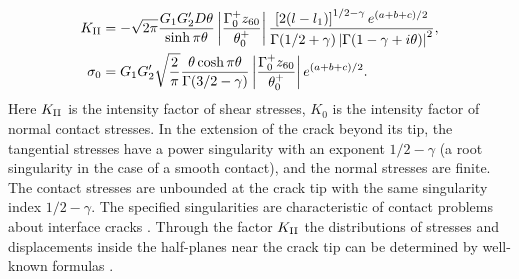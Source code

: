 \begin{align*}
K_{{\rm II}} &=-\sqrt{2\pi } \dfrac{G_{1} G'_{2} D\theta }{\sinh \pi \theta } \left|\dfrac{\Gamma _{0}^{+} z_{60} }{\theta _{0}^{+} } \right|\dfrac{\left[2(l-l_{1} )\right]^{1/2 -\gamma } e^{(a+b+c)/2} }{\Gamma (1/2 +\gamma )\left|\Gamma (1-\gamma +i\theta )\right|^{2} } ,
\\
\sigma _{0} &=G_{1} G'_{2} \sqrt{\dfrac{2}{\pi } } \dfrac{\theta \cosh \pi \theta }{\Gamma (3/2 -\gamma )} \left|\dfrac{\Gamma _{0}^{+} z_{60} }{\theta _{0}^{+} } \right|e^{(a+b+c)/2 } .  
\end{align*}
%
Here $K_{{\rm II}} $ is the intensity factor of shear stresses, $K_{0} $ is the intensity factor of normal contact stresses. In the extension of the crack beyond its tip, the tangential stresses have a power singularity with an exponent $1/2 -\gamma $ (a root singularity in the case of a smooth contact), and the normal stresses are finite. The contact stresses are unbounded at the crack tip with the same singularity index $1/2 -\gamma $. The specified singularities are characteristic of contact problems about interface cracks \cite{Ostryk23}. Through the factor $K_{{\rm II}} $ the distributions of stresses and displacements inside the half-planes near the crack tip can be determined by well-known formulas \cite{Ostryk23,Ostryk76}.

